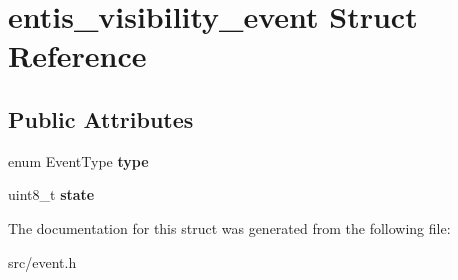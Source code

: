 \hypertarget{structentis__visibility__event}{}\section{entis\+\_\+visibility\+\_\+event Struct Reference}
\label{structentis__visibility__event}
\subsection*{Public Attributes}
\begin{DoxyCompactItemize}
\item 
\mbox{\label{structentis__visibility__event_a24973762c7e625289fa844d530c92bb7}} 
enum Event\+Type {\bfseries type}
\item 
\mbox{\label{structentis__visibility__event_a6b96f2de6bdf0c114dc9583f387aecae}} 
uint8\+\_\+t {\bfseries state}
\end{DoxyCompactItemize}


The documentation for this struct was generated from the following file\+:\begin{DoxyCompactItemize}
\item 
src/event.\+h\end{DoxyCompactItemize}
